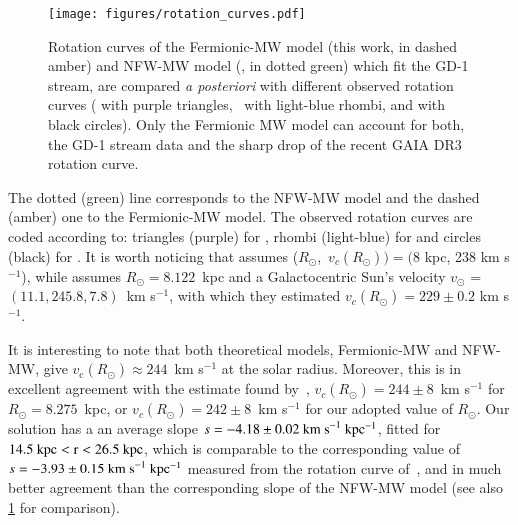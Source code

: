 \documentclass[twocolumn]{aa}
\begin{document}
\begin{figure}
   \centering
   \texttt{[image: figures/rotation\_curves.pdf]}
   \caption{Rotation curves of the Fermionic-MW model (this work, in dashed amber) and NFW-MW model (\cite{2019MNRAS.486.2995M}, in dotted green) which fit the GD-1 stream, are compared \textit{a posteriori} with different observed rotation curves (\citealp{Eilers_2019} with purple triangles,~\citealp{sofue_2020} with light-blue rhombi, and \citealp{Jiao2023} with black circles). Only the Fermionic MW model can account for both, the GD-1 stream data and the sharp drop of the recent GAIA DR3 rotation curve.}
   \label{fig:rotcurve}
\end{figure}

The dotted (green) line corresponds to the NFW-MW model and the dashed (amber) one to the Fermionic-MW model.
The observed rotation curves are coded according to: triangles (purple)
for \citet{Eilers_2019}, rhombi (light-blue) for \citet{sofue_2020} and
circles (black) for \citet{Jiao2023}. It is worth noticing  that \citet{sofue_2020} assumes
($R_\odot$,~$v_c(R_\odot))=(8$ kpc, 238 km s$^{-1}$), while \citet{Eilers_2019}
assumes $R_\odot=8.122$~kpc and a Galactocentric Sun's velocity $v_\odot$ = $(11.1, 245.8, 7.8)$~km s$^{-1}$,
with which they estimated $v_c(R_\odot)=229\pm0.2$ km s$^{-1}$.

It is interesting to note that both theoretical models, Fermionic-MW and NFW-MW, give $v_\mathrm{c}(R_\odot)\approx 244$~km s$^{-1}$ 
at the solar radius.
Moreover, this is in excellent agreement with the estimate found
by~\citet{2020arXiv201202169B}, $v_c(R_\odot)=244\pm 8$~km s$^{-1}$ for $R_\odot = 8.275$~kpc, or $v_c(R_\odot)=242\pm 8$~km s$^{-1}$ for our adopted value of $R_\odot$.
Our solution has a an average slope $s=-4.18\pm0.02~\rm{km~s}^{-1}~kpc^{-1}$, fitted for $14.5~\rm{kpc} < r < 26.5~\rm{kpc}$, which is 
comparable to the corresponding value of $s=-3.93\pm0.15~\rm{km~s}^{-1}~kpc^{-1}$ measured from the rotation curve of~\citet{Jiao2023}, and in much better agreement than the corresponding slope of the NFW-MW model (see also \cref{fig:rotcurve} for comparison).
\end{document}
